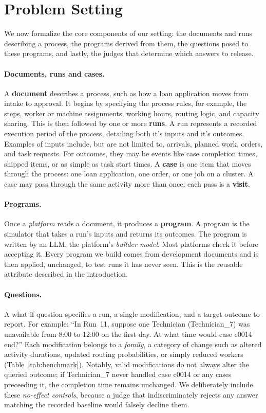 \section{Problem Setting}
\label{sec:problem}

We now formalize the core components of our setting: the documents and runs describing a process, the programs derived from them, the questions posed to these programs, and lastly, the judges that determine which answers to release.

\paragraph{Documents, runs and cases.} A \textbf{document} describes a process, such as how a loan application moves from intake to approval. It begins by specifying the process rules, for example, the steps, worker or machine assignments, working hours, routing logic, and capacity sharing. This is then followed by one or more \textbf{runs}. A run represents a recorded execution period of the process, detailing both it's inputs and it's outcomes. Examples of inputs include, but are not limited to, arrivals, planned work, orders, and task requests. For outcomes, they may be events like case completion times, shipped items, or as simple as task start times. A \textbf{case} is one item that moves through the process: one loan application, one order, or one job on a cluster. A case may pass through the same activity more than once; each pass is a \textbf{visit}.

\paragraph{Programs.} Once a \emph{platform} reads a document, it produces a \textbf{program}. A program is the simulator that takes a run's inputs and returns its outcomes. The program is written by an LLM, the platform's \emph{builder model}. Most platforms check it before accepting it. Every program we build comes from development documents and is then applied, unchanged, to test runs it has never seen. This is the reusable attribute described in the introduction.

\paragraph{Questions.} A what-if question specifies a run, a single modification, and a target outcome to report. For example: ``In Run~11, suppose one Technician (Technician\_7) was unavailable from 8:00 to 12:00 on the first day. At what time would case c0014 end?'' Each modification belongs to a \emph{family}, a category of change such as altered activity durations, updated routing probabilities, or simply reduced workers (Table~\ref{tab:benchmark}). Notably, valid modifications do not always alter the queried outcome; if Technician\_7 never handled case c0014 or any cases preceeding it, the completion time remains unchanged. We deliberately include these \emph{no-effect controls}, because a judge that indiscriminately rejects any answer matching the recorded baseline would falsely decline them.

